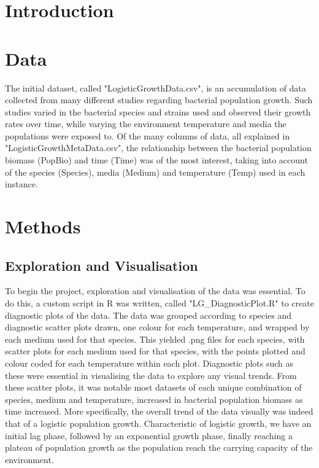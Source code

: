 \documentclass[11pt, a4paper]{article} %
\begin{document}
\section{Introduction}

\section{Data}

The initial dataset, called "LogisticGrowthData.csv", is an accumulation of data collected from many different studies regarding bacterial population growth. Such studies varied in the bacterial species and strains used and observed their growth rates over time, while varying the environment temperature and media the populations were exposed to. Of the many columns of data, all explained in "LogisticGrowthMetaData.csv", the relationship between the bacterial population biomass (PopBio) and time (Time) was of the most interest, taking into account of the species (Species), media (Medium) and temperature (Temp) used in each instance.

\section{Methods}

\subsection{Exploration and Visualisation}

To begin the project, exploration and visualisation of the data was essential. To do this, a custom script in R was written, called "LG\_DiagnosticPlot.R" to create diagnostic plots of the data. The data was grouped according to species and diagnostic scatter plots drawn, one colour for each temperature, and wrapped by each medium used for that species. This yielded .png files for each species, with scatter plots for each medium used for that species, with the points plotted and colour coded for each temperature within each plot. Diagnostic plots such as these were essential in visualising the data to explore any visual trends. From these scatter plots, it was notable most datasets of each unique combination of species, medium and temperature, increased in bacterial population biomass as time increased. More specifically, the overall trend of the data visually was indeed that of a logistic population growth. Characteristic of logistic growth, we have an initial lag phase, followed by an exponential growth phase, finally reaching a plateau of population growth as the population reach the carrying capacity of the environment.
\end{document}
